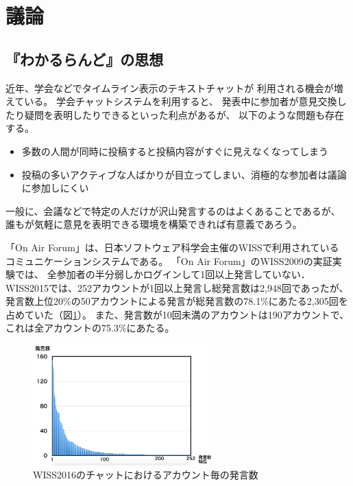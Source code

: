 \section{議論}

\subsection{『わかるらんど』の思想}

近年、学会などでタイムライン表示のテキストチャットが
利用される機会が増えている\cite{WISSのチャットの報告論文}。
学会チャットシステムを利用すると、
発表中に参加者が意見交換したり疑問を表明したりできるといった利点があるが、
以下のような問題も存在する。

\begin{itemize}
\item 多数の人間が同時に投稿すると投稿内容がすぐに見えなくなってしまう
\item 投稿の多いアクティブな人ばかりが目立ってしまい、消極的な参加者は議論に参加しにくい
\end{itemize}

一般に、会議などで特定の人だけが沢山発言するのはよくあることであるが、
誰もが気軽に意見を表明できる環境を構築できれば有意義であろう。

「On Air Forum」は、日本ソフトウェア科学会主催のWISSで利用されている
コミュニケーションシステムである。
「On Air Forum」のWISS2009の実証実験\cite{nishida2011}では、
全参加者の半分弱しかログインして1回以上発言していない．
WISS2015では、252アカウントが1回以上発言し総発言数は2,948回であったが、
発言数上位20\%の50アカウントによる発言が総発言数の78.1\%にあたる2,305回を占めていた（図\ref{wisschat}）。
また、発言数が10回未満のアカウントは190アカウントで、これは全アカウントの75.3\%にあたる。

\begin{figure}[h]
\centering
\includegraphics[width=7cm]{images/wisschat.png}
\caption{WISS2016のチャットにおけるアカウント毎の発言数}
\label{wisschat}
\end{figure}

